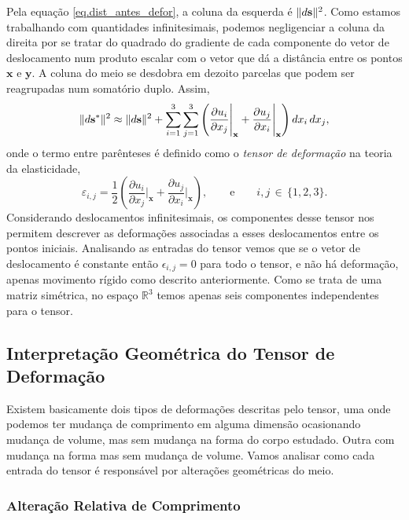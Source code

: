 Pela equa\c{c}\~ao \ref{eq.dist_antes_defor}, a coluna  da esquerda \'e $\lVert d\mathbf{s}\rVert^2$. Como estamos trabalhando com quantidades infinitesimais, podemos negligenciar a coluna da direita por se tratar do quadrado do gradiente de cada componente do vetor de deslocamento num produto escalar com o vetor que d\'a a dist\^ancia entre os pontos $\mathbf{x}$  e $\mathbf{y}$. A coluna do meio se desdobra em dezoito parcelas que podem ser reagrupadas num somat\'orio duplo. Assim,
\begin{equation*}
\lVert d\mathbf{s}^*\rVert^2\approx\lVert d\mathbf{s}\rVert^2+\sum_{i=1}^3\sum_{j=1}^3\left(\frac{\partial u_i}{\partial x_j}\Bigg\vert_{\mathbf{x}}+\frac{\partial u_j}{\partial x_i}\Bigg\vert_{\mathbf{x}}\right)dx_i\,dx_j,
\end{equation*}
onde o termo entre par\^enteses \'e definido como o \textit{tensor de deforma\c{c}\~ao} na teoria da elasticidade,
\begin{equation*}
\varepsilon_{i,j}=\frac{1}{2}\left(\frac{\partial u_i}{\partial x_j}\Bigg\vert_{\mathbf{x}}+\frac{\partial u_j}{\partial x_i}\Bigg\vert_{\mathbf{x}}\right),\qquad\text{e}\qquad i,j\,\in\,\{1,2,3\}.
\end{equation*}
Considerando deslocamentos infinitesimais, os componentes desse tensor nos permitem descrever as deforma\c{c}\~oes associadas a esses deslocamentos entre os pontos iniciais. Analisando as entradas do tensor vemos que se o vetor de deslocamento \'e constante ent\~ao $\epsilon_{i,j}=0$ para todo o tensor, e n\~ao h\'a deforma\c{c}\~ao, apenas movimento r\'igido como descrito anteriormente. Como se trata de uma matriz sim\'etrica, no espa\c{c}o $\mathbb{R}^3$ temos apenas seis componentes independentes para o tensor.

\subsection{Interpreta\c{c}\~ao Geom\'etrica do Tensor de Deforma\c{c}\~ao}

Existem basicamente dois tipos de deforma\c{c}\~oes descritas pelo tensor, uma onde podemos ter mudan\c{c}a de comprimento em alguma dimens\~ao ocasionando mudan\c{c}a de volume, mas sem mudan\c{c}a na forma do corpo estudado. Outra com mudan\c{c}a na forma mas sem mudan\c{c}a de volume. Vamos analisar como cada entrada do tensor \'e respons\'avel por altera\c{c}\~oes geom\'etricas do meio.

\subsubsection{Altera\c{c}\~ao Relativa de Comprimento}\label{sec.alte_compri}

